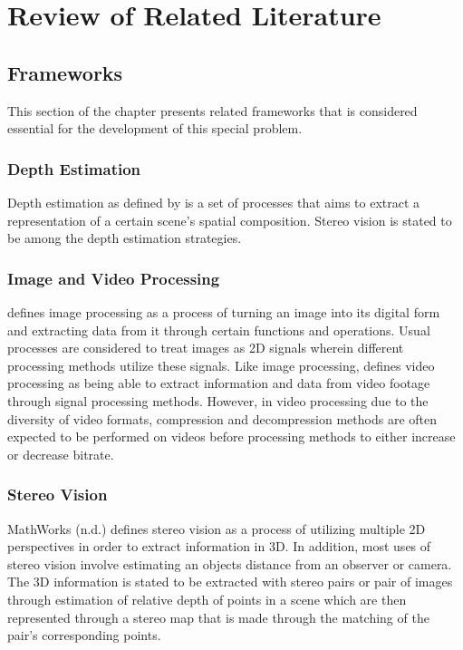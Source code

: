 \chapter{Review of Related Literature}

\section{Frameworks}
This section of the chapter presents related frameworks that is considered essential for the development of this special problem.

\subsection{Depth Estimation}
Depth estimation as defined by  is a set of processes that aims to extract a representation of a certain scene's spatial composition. Stereo vision is stated to be among the depth estimation strategies.

\subsection{Image and Video Processing}
 defines image processing as a process of turning an image into its digital form and extracting data from it through certain functions and operations. Usual processes are considered to treat images as 2D signals wherein different processing methods utilize these signals.
Like image processing,  defines video processing as being able to extract information and data from video footage through signal processing methods. However, in video processing due to the diversity of video formats, compression and decompression methods are often expected to be performed on videos before processing methods to either increase or decrease bitrate.

\subsection{Stereo Vision}
MathWorks (n.d.) defines stereo vision as a process of utilizing multiple 2D perspectives in order to extract information in 3D. In addition, most uses of stereo vision involve estimating an objects distance from an observer or camera. The 3D information is stated to be extracted with stereo pairs or pair of images through estimation of relative depth of points in a scene which are then represented through a stereo map that is made through the matching of the pair's corresponding points.


